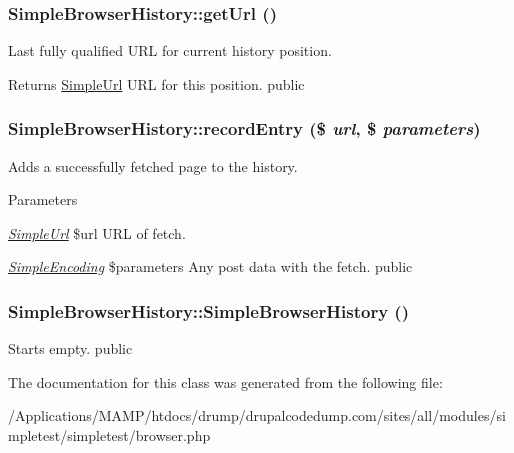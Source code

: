 \hypertarget{class_simple_browser_history_aed47b8f24be922789e6046ae5403efbb}{
\subsubsection[{getUrl}]{\setlength{\rightskip}{0pt plus 5cm}SimpleBrowserHistory::getUrl ()}}
\label{class_simple_browser_history_aed47b8f24be922789e6046ae5403efbb}
Last fully qualified URL for current history position. \begin{DoxyReturn}{Returns}
\hyperlink{class_simple_url}{SimpleUrl} URL for this position.  public 
\end{DoxyReturn}
\hypertarget{class_simple_browser_history_a788a233220aecc310b56f21562c06d43}{
\subsubsection[{recordEntry}]{\setlength{\rightskip}{0pt plus 5cm}SimpleBrowserHistory::recordEntry (\$ {\em url}, \/  \$ {\em parameters})}}
\label{class_simple_browser_history_a788a233220aecc310b56f21562c06d43}
Adds a successfully fetched page to the history. 
\begin{DoxyParams}{Parameters}
\item[{\em \hyperlink{class_simple_url}{SimpleUrl}}]\$url URL of fetch. \item[{\em \hyperlink{class_simple_encoding}{SimpleEncoding}}]\$parameters Any post data with the fetch.  public \end{DoxyParams}
\hypertarget{class_simple_browser_history_a2127741caab69dd12cc32b322d5e11fa}{
\subsubsection[{SimpleBrowserHistory}]{\setlength{\rightskip}{0pt plus 5cm}SimpleBrowserHistory::SimpleBrowserHistory ()}}
\label{class_simple_browser_history_a2127741caab69dd12cc32b322d5e11fa}
Starts empty.  public 

The documentation for this class was generated from the following file:\begin{DoxyCompactItemize}
\item 
/Applications/MAMP/htdocs/drump/drupalcodedump.com/sites/all/modules/simpletest/simpletest/browser.php\end{DoxyCompactItemize}
